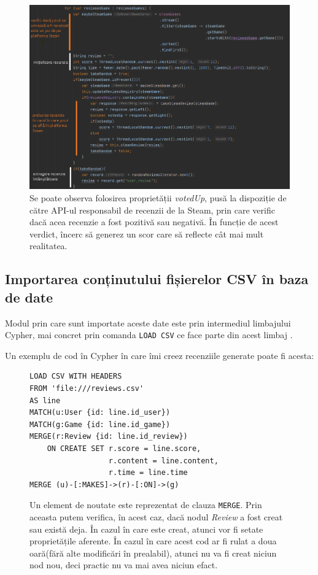 \documentclass[12pt,a4paper]{report}
\begin{document}
\begin{figure}[H]
\centering
\caption{}
\begin{adjustbox}{max size={\textwidth}{\textheight}}
\includegraphics[scale = 0.7]{exemplu_14_review_code_java}
\end{adjustbox}
\caption*{Se poate observa folosirea proprietății \emph{votedUp}, pusă la dispoziție de către API-ul responsabil de recenzii de la Steam, prin care verific dacă acea recenzie a fost pozitivă sau negativă. În funcție de acest verdict, încerc să generez un scor care să reflecte cât mai mult realitatea.}
\end{figure}


\subsection{Importarea conținutului fișierelor CSV în baza de date}

Modul prin care sunt importate aceste date este prin intermediul limbajului Cypher, mai concret prin comanda \texttt{LOAD CSV} ce face parte din acest limbaj \cite{18}.

Un exemplu de cod în Cypher în care îmi creez recenziile generate poate fi acesta:

\begin{figure}[H]
\centering
\begin{BVerbatim}
LOAD CSV WITH HEADERS
FROM 'file:///reviews.csv'
AS line
MATCH(u:User {id: line.id_user})
MATCH(g:Game {id: line.id_game})
MERGE(r:Review {id: line.id_review})
    ON CREATE SET r.score = line.score,
                  r.content = line.content,
                  r.time = line.time
MERGE (u)-[:MAKES]->(r)-[:ON]->(g)
\end{BVerbatim}
\caption*{Un element de noutate este reprezentat de clauza \texttt{MERGE}. Prin aceasta putem verifica, în acest caz, dacă nodul \emph{Review} a fost creat sau există deja. În cazul în care este creat, atunci vor fi setate proprietățile aferente. În cazul în care acest cod ar fi rulat a doua oară(fără alte modificări în prealabil), atunci nu va fi creat niciun nod nou, deci practic nu va mai avea niciun efact.}
\end{figure}
\end{document}
